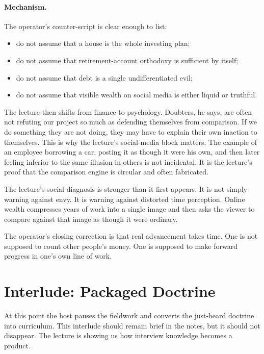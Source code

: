 \paragraph{Mechanism.}
The operator's counter-script is clear enough to list:
\begin{itemize}
\item do not assume that a house is the whole investing plan;
\item do not assume that retirement-account orthodoxy is sufficient by itself;
\item do not assume that debt is a single undifferentiated evil;
\item do not assume that visible wealth on social media is either liquid or truthful.
\end{itemize}

The lecture then shifts from finance to psychology. Doubters, he says, are often not refuting our project so much as defending themselves from comparison. If we do something they are not doing, they may have to explain their own inaction to themselves. This is why the lecture's social-media block matters. The example of an employee borrowing a car, posting it as though it were his own, and then later feeling inferior to the same illusion in others is not incidental. It is the lecture's proof that the comparison engine is circular and often fabricated.

\begin{remark}
The lecture's social diagnosis is stronger than it first appears. It is not simply warning against envy. It is warning against distorted time perception. Online wealth compresses years of work into a single image and then asks the viewer to compare against that image as though it were ordinary.
\end{remark}

The operator's closing correction is that real advancement takes time. One is not supposed to count other people's money. One is supposed to make forward progress in one's own line of work.

\section{Interlude: Packaged Doctrine}

At this point the host pauses the fieldwork and converts the just-heard doctrine into curriculum. This interlude should remain brief in the notes, but it should not disappear. The lecture is showing us how interview knowledge becomes a product.

